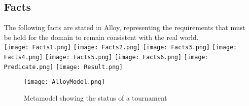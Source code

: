 \documentclass{article}
\begin{document}
\subsection{Facts}
The following facts are stated in Alloy, representing the requirements that must be held for the domain to remain consistent with the real world. \\
\texttt{[image: Facts1.png]}
\newpage
\texttt{[image: Facts2.png]}
\texttt{[image: Facts3.png]}
\texttt{[image: Facts4.png]}
\texttt{[image: Facts5.png]}
\newpage
\texttt{[image: Facts6.png]}
\texttt{[image: Predicate.png]}
\texttt{[image: Result.png]}

\begin{figure}[H]
    \texttt{[image: AlloyModel.png]}
    \caption{Metamodel showing the status of a tournament}
\end{figure}
\newpage
\end{document}

